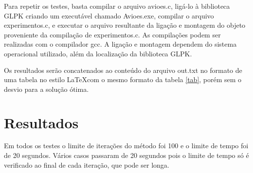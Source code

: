 \documentclass[a4paper,10pt]{abnt} %
\begin{document}
Para repetir os testes, basta compilar o arquivo avioes.c, ligá-lo à biblioteca GLPK criando um executável chamado Avioes.exe, compilar o arquivo experimentos.c, e executar o arquivo resultante da ligação e montagem do objeto proveniente da compilação de experimentos.c. As compilações podem ser realizadas com o compilador gcc. A ligação e montagem dependem do sistema operacional utilizado, além da localização da biblioteca GLPK.

Os resultados serão concatenados ao conteúdo do arquivo out.txt no formato de uma tabela no estilo \LaTeX com o mesmo formato da tabela \ref{tab}, porém sem o desvio para a solução ótima.

\section{Resultados}

Em todos os testes o limite de iterações do método foi 100 e o limite de tempo foi de 20 segundos. Vários casos passaram de 20 segundos pois o limite de tempo só é verificado ao final de cada iteração, que pode ser longa.
\end{document}
